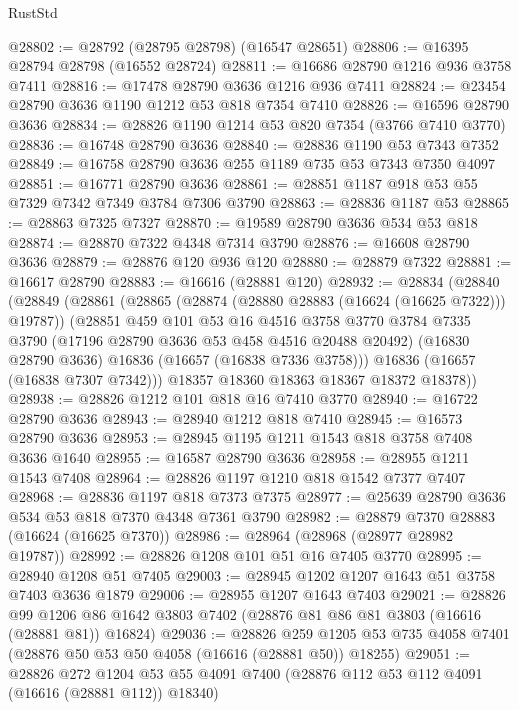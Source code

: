 \begin{lexlean}{RustStd}
\begin{coremodule}
@28802 := @28792 (@28795 @28798) (@16547 @28651)
@28806 := @16395 @28794 @28798 (@16552 @28724)
@28811 := @16686 @28790 @1216 @936 @3758 @7411
@28816 := @17478 @28790 @3636 @1216 @936 @7411
@28824 := @23454 @28790 @3636 @1190 @1212 @53 @818 @7354 @7410
@28826 := @16596 @28790 @3636
@28834 := @28826 @1190 @1214 @53 @820 @7354 (@3766 @7410 @3770)
@28836 := @16748 @28790 @3636
@28840 := @28836 @1190 @53 @7343 @7352
@28849 := @16758 @28790 @3636 @255 @1189 @735 @53 @7343 @7350 @4097
@28851 := @16771 @28790 @3636
@28861 := @28851 @1187 @918 @53 @55 @7329 @7342 @7349 @3784 @7306 @3790
@28863 := @28836 @1187 @53
@28865 := @28863 @7325 @7327
@28870 := @19589 @28790 @3636 @534 @53 @818
@28874 := @28870 @7322 @4348 @7314 @3790
@28876 := @16608 @28790 @3636
@28879 := @28876 @120 @936 @120
@28880 := @28879 @7322
@28881 := @16617 @28790
@28883 := @16616 (@28881 @120)
@28932 := @28834
    (@28840
      (@28849
        (@28861
          (@28865 (@28874 (@28880 @28883 (@16624 (@16625 @7322))) @19787))
          (@28851
            @459
            @101
            @53
            @16
            @4516
            @3758
            @3770
            @3784
            @7335
            @3790
            (@17196 @28790 @3636 @53 @458 @4516 @20488 @20492)
            (@16830 @28790 @3636)
            @16836
            (@16657 (@16838 @7336 @3758)))
          @16836
          (@16657 (@16838 @7307 @7342)))
        @18357
        @18360
        @18363
        @18367
        @18372
        @18378))
@28938 := @28826 @1212 @101 @818 @16 @7410 @3770
@28940 := @16722 @28790 @3636
@28943 := @28940 @1212 @818 @7410
@28945 := @16573 @28790 @3636
@28953 := @28945 @1195 @1211 @1543 @818 @3758 @7408 @3636 @1640
@28955 := @16587 @28790 @3636
@28958 := @28955 @1211 @1543 @7408
@28964 := @28826 @1197 @1210 @818 @1542 @7377 @7407
@28968 := @28836 @1197 @818 @7373 @7375
@28977 := @25639 @28790 @3636 @534 @53 @818 @7370 @4348 @7361 @3790
@28982 := @28879 @7370 @28883 (@16624 (@16625 @7370))
@28986 := @28964 (@28968 (@28977 @28982 @19787))
@28992 := @28826 @1208 @101 @51 @16 @7405 @3770
@28995 := @28940 @1208 @51 @7405
@29003 := @28945 @1202 @1207 @1643 @51 @3758 @7403 @3636 @1879
@29006 := @28955 @1207 @1643 @7403
@29021 := @28826
    @99
    @1206
    @86
    @1642
    @3803
    @7402
    (@28876 @81 @86 @81 @3803 (@16616 (@28881 @81)) @16824)
@29036 := @28826
    @259
    @1205
    @53
    @735
    @4058
    @7401
    (@28876 @50 @53 @50 @4058 (@16616 (@28881 @50)) @18255)
@29051 := @28826
    @272
    @1204
    @53
    @55
    @4091
    @7400
    (@28876 @112 @53 @112 @4091 (@16616 (@28881 @112)) @18340)

\end{coremodule}
\end{lexlean}
